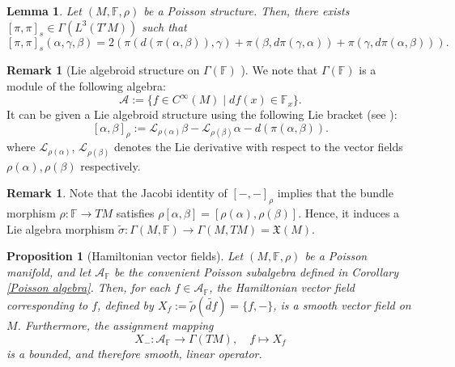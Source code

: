 \documentclass[11pt,reqno]{amsart}
\newtheorem{lemma}[theorem]{Lemma}
\newtheorem{proposition}[theorem]{Proposition}
\theoremstyle{definition}
\newtheorem{remark}[theorem]{Remark}
\numberwithin{equation}{section}
\begin{document}
    
\begin{lemma}\cite[Proposition 7.7]{5}
Let $(M, \mathbb F, \rho)$ be a Poisson structure. Then, there exists $[\pi, \pi]_s \in \Gamma(L^3(T'M))$ such that
\[
[\pi, \pi]_s(\alpha, \gamma, \beta) = 2(\pi(d(\pi(\alpha, \beta)), \gamma) + \pi(\beta, d\pi(\gamma, \alpha)) +\pi(\gamma, d\pi(\alpha, \beta))).
\]
\end{lemma}

\begin{remark}[Lie algebroid structure on $\Gamma(\mathbb F)$ ]
 
We note that $\Gamma(\mathbb{F})$ is a module of the following algebra:
\[
\mathcal{A} := \{f \in C^{\infty}(M) \mid df(x) \in \mathbb{F}_{x}\}.
\]
It can be given a Lie algebroid structure using the following Lie bracket (see \cite[Proposition 7.3]{5}):
\[
[\alpha, \beta]_{\rho} := \mathcal{L}_{\rho(\alpha)}\beta - \mathcal{L}_{\rho(\beta)}\alpha - d(\pi(\alpha, \beta)).
\]
where $\mathcal L_{\rho (\alpha)}$, $\mathcal L_{\rho (\beta)}$ denotes the Lie derivative with respect to the vector fields $\rho(\alpha),  \rho(\beta)$ respectively.
\end{remark}

\begin{remark}
Note that the Jacobi identity of $[-,-]_\rho$ implies that the bundle morphism $\rho: \mathbb{F} \rightarrow TM$ satisfies $\rho[\alpha, \beta] = [\rho(\alpha), \rho(\beta)]$. Hence, it induces a Lie algebra morphism $\tilde{\sigma}: \Gamma(M, \mathbb{F}) \rightarrow \Gamma(M, TM) = \mathfrak{X}(M)$. 
\end{remark}


\begin{proposition}[Hamiltonian vector fields]
Let $(M, \mathbb{F}, \rho)$ be a Poisson manifold, and let $\mathcal{A}_{\mathbb{F}}$ be the convenient Poisson subalgebra defined in Corollary \ref{Poisson algebra}. Then, for each $f \in \mathcal{A}_{\mathbb{F}}$, the Hamiltonian vector field corresponding to $f$, defined by $X_{f} := \tilde{\rho}(\widetilde{df}) = \{f, -\}$, is a smooth vector field on $M$. Furthermore, the assignment mapping 
\[X_{-}: \mathcal{A}_{\mathbb {F}} \rightarrow \Gamma(TM), \quad f \mapsto X_{f}\] 
is a bounded, and therefore smooth, linear operator.
\end{proposition}
\end{document}
